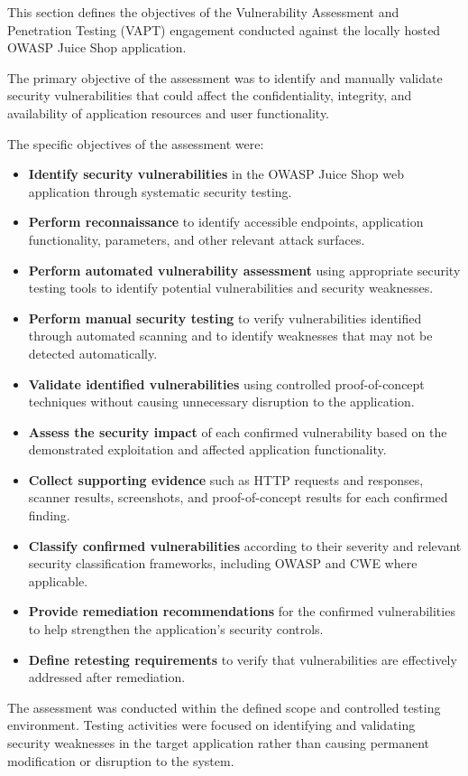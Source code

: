 This section defines the objectives of the Vulnerability Assessment
and Penetration Testing (VAPT) engagement conducted against the
locally hosted OWASP Juice Shop application.

The primary objective of the assessment was to identify and manually
validate security vulnerabilities that could affect the
confidentiality, integrity, and availability of application
resources and user functionality.

The specific objectives of the assessment were:

\begin{itemize}

    \item \textbf{Identify security vulnerabilities} in the OWASP
    Juice Shop web application through systematic security testing.

    \item \textbf{Perform reconnaissance} to identify accessible
    endpoints, application functionality, parameters, and other
    relevant attack surfaces.

    \item \textbf{Perform automated vulnerability assessment} using
    appropriate security testing tools to identify potential
    vulnerabilities and security weaknesses.

    \item \textbf{Perform manual security testing} to verify
    vulnerabilities identified through automated scanning and to
    identify weaknesses that may not be detected automatically.

    \item \textbf{Validate identified vulnerabilities} using
    controlled proof-of-concept techniques without causing
    unnecessary disruption to the application.

    \item \textbf{Assess the security impact} of each confirmed
    vulnerability based on the demonstrated exploitation and affected
    application functionality.

    \item \textbf{Collect supporting evidence} such as HTTP
    requests and responses, scanner results, screenshots, and
    proof-of-concept results for each confirmed finding.

    \item \textbf{Classify confirmed vulnerabilities} according to
    their severity and relevant security classification frameworks,
    including OWASP and CWE where applicable.

    \item \textbf{Provide remediation recommendations} for the
    confirmed vulnerabilities to help strengthen the application's
    security controls.

    \item \textbf{Define retesting requirements} to verify that
    vulnerabilities are effectively addressed after remediation.

\end{itemize}

The assessment was conducted within the defined scope and controlled
testing environment. Testing activities were focused on identifying
and validating security weaknesses in the target application rather
than causing permanent modification or disruption to the system.